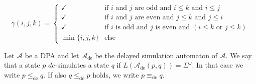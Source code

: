 \begin{defn}
	$$ \gamma(i, j, k) = \begin{cases}
		\checkmark & \text{if } i \text{ and } j \text{ are odd and } i \leq k \text{ and } i \leq j \\
		\checkmark & \text{if } i \text{ and } j \text{ are even and } j \leq k \text{ and } j \leq i \\
		\checkmark & \text{if } i \text{ is odd and } j \text{ is even and } (i \leq k \text{ or } j \leq k) \\
		\min \{ i,j,k \} & \text{else}
	\end{cases} $$
\end{defn}


\begin{defn}
	Let $\mathcal{A}$ be a DPA and let $\mathcal{A}_\text{de}$ be the delayed simulation automaton of $\mathcal{A}$. We say that a state $p$ $de$-simulates a state $q$ if $L(\mathcal{A}_\text{de}(p, q)) = \Sigma^\omega$. In that case we write $p \leq_\text{de} q$. If also $q \leq_\text{de} p$ holds, we write $p \equiv_\text{de} q$.
\end{defn}
